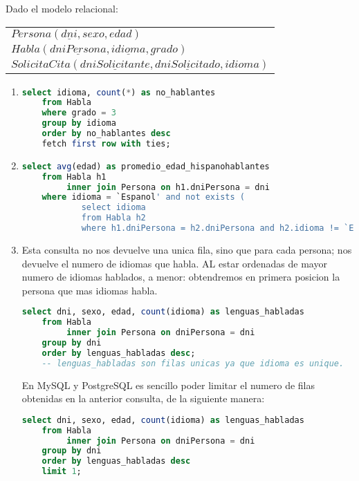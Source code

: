 Dado el modelo relacional:
\begin{center}
	\begin{tabular}{l}
		$Persona(\underline{dni}, sexo, edad)$\\
		$Habla(\underline{dniPersona}, \underline{idioma}, grado)$\\
		$SolicitaCita(\underline{dniSolicitante}, \underline{dniSolicitado}, idioma)$\\	
	\end{tabular}
\end{center}

\begin{enumerate}
	
	\item 
	\begin{lstlisting}[language=sql]
	select idioma, count(*) as no_hablantes
	from Habla
	where grado = 3
	group by idioma
	order by no_hablantes desc
	fetch first row with ties;\end{lstlisting}
	
	\item 
	\begin{lstlisting}[language=sql]
	select avg(edad) as promedio_edad_hispanohablantes
	from Habla h1
		 inner join Persona on h1.dniPersona = dni
	where idioma = `Espanol' and not exists (
			select idioma
			from Habla h2
			where h1.dniPersona = h2.dniPersona and h2.idioma != `Espanol');\end{lstlisting}
			
	\item 
	Esta consulta no nos devuelve una unica fila, sino que para cada persona; nos devuelve el numero de idiomas que habla. AL estar ordenadas de mayor numero de idiomas hablados, a menor: obtendremos en primera posicion la persona que mas idiomas habla.
	\begin{lstlisting}[language=sql]
	select dni, sexo, edad, count(idioma) as lenguas_habladas
	from Habla
		 inner join Persona on dniPersona = dni
	group by dni
	order by lenguas_habladas desc;
	-- lenguas_habladas son filas unicas ya que idioma es unique.\end{lstlisting}
	
	\newpage
	En MySQL y PostgreSQL es sencillo poder limitar el numero de filas obtenidas en la anterior consulta, de la siguiente manera:
	\begin{lstlisting}[language=sql]
	select dni, sexo, edad, count(idioma) as lenguas_habladas
	from Habla
		 inner join Persona on dniPersona = dni
	group by dni
	order by lenguas_habladas desc
	limit 1;\end{lstlisting}
	

\end{enumerate}
